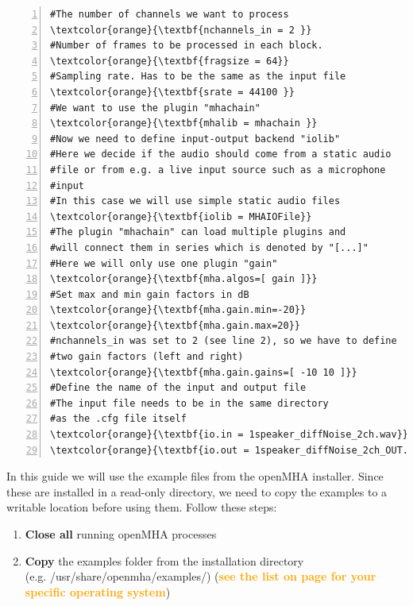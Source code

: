 \documentclass[11pt,a4paper,twoside]{article}
\newcommand{\+}{\discretionary{\mbox{\scriptsize$\hookleftarrow$}}{}{}}
\begin{document}
{{\begin{Verbatim}[frame=single,numbers=left,commandchars=\\\{\}]
#The number of channels we want to process
\textcolor{orange}{\textbf{nchannels_in = 2 }}
#Number of frames to be processed in each block.
\textcolor{orange}{\textbf{fragsize = 64}}
#Sampling rate. Has to be the same as the input file
\textcolor{orange}{\textbf{srate = 44100 }}
#We want to use the plugin "mhachain"
\textcolor{orange}{\textbf{mhalib = mhachain }}
#Now we need to define input-output backend "iolib"
#Here we decide if the audio should come from a static audio
#file or from e.g. a live input source such as a microphone
#input
#In this case we will use simple static audio files
\textcolor{orange}{\textbf{iolib = MHAIOFile}}
#The plugin "mhachain" can load multiple plugins and
#will connect them in series which is denoted by "[...]"
#Here we will only use one plugin "gain"
\textcolor{orange}{\textbf{mha.algos=[ gain ]}}
#Set max and min gain factors in dB
\textcolor{orange}{\textbf{mha.gain.min=-20}}
\textcolor{orange}{\textbf{mha.gain.max=20}}
#nchannels_in was set to 2 (see line 2), so we have to define 
#two gain factors (left and right)
\textcolor{orange}{\textbf{mha.gain.gains=[ -10 10 ]}}
#Define the name of the input and output file
#The input file needs to be in the same directory 
#as the .cfg file itself
\textcolor{orange}{\textbf{io.in = 1speaker_diffNoise_2ch.wav}}
\textcolor{orange}{\textbf{io.out = 1speaker_diffNoise_2ch_OUT.wav}}
\end{Verbatim} 



\newpage 
In this guide we will use the example files from the openMHA installer.
Since these are installed in a read-only directory, we need to copy
the examples to a writable location before using them. 
Follow these steps:


\begin{enumerate}
    \item \textbf{Close all} running openMHA processes
    
    \item \textbf{Copy} the examples folder from the installation directory
      \\
      (e.g. /usr/share/openmha/examples/)
      (\textcolor{orange}
        {\textbf{see the list on page \pageref{list:examples-location}
            for your specific operating system}})
   

\end{enumerate}}}
\end{document}
